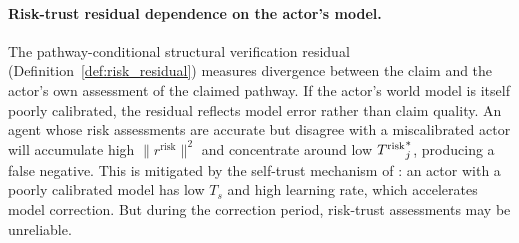 \paragraph{Risk-trust residual dependence on the actor's model.} The
pathway-conditional structural verification residual
(Definition~\ref{def:risk_residual}) measures divergence between the
claim and the actor's own assessment of the claimed pathway. If the
actor's world model is itself poorly calibrated, the residual reflects
model error rather than claim quality. An agent whose risk assessments
are accurate but disagree with a miscalibrated actor will accumulate
high $\|r^{\mathrm{risk}}\|^2$ and concentrate around low
${T^{\mathrm{risk}}}_j^*$, producing a false negative. This is mitigated by the self-trust
mechanism of \citet{lasser2026gfm}: an actor with a poorly calibrated
model has low $T_s$ and high learning rate, which accelerates model
correction. But during the correction period, risk-trust assessments
may be unreliable.

